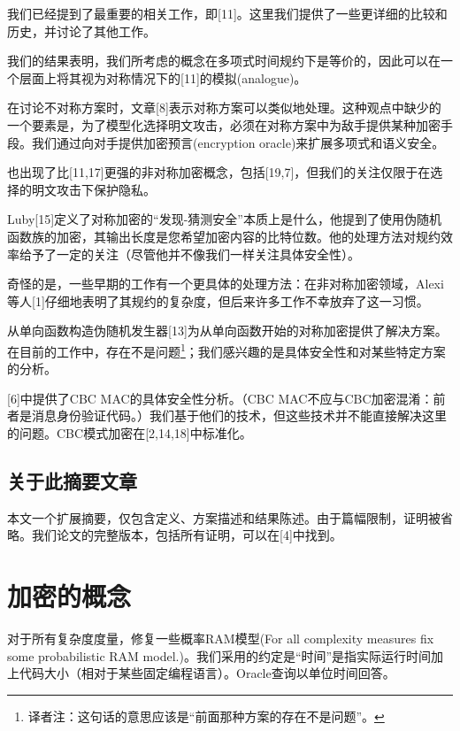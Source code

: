 \documentclass[]{article}
\begin{document}
我们已经提到了最重要的相关工作，即[11]。这里我们提供了一些更详细的比较和历史，并讨论了其他工作。\par

我们的结果表明，我们所考虑的概念在多项式时间规约下是等价的，因此可以在一个层面上将其视为对称情况下的[11]的模拟(analogue)。\par

在讨论不对称方案时，文章[8]表示对称方案可以类似地处理。这种观点中缺少的一个要素是，为了模型化选择明文攻击，必须在对称方案中为敌手提供某种加密手段。我们通过向对手提供加密预言(encryption oracle)来扩展多项式和语义安全。\par

也出现了比[11,17]更强的非对称加密概念，包括[19,7]，但我们的关注仅限于在选择的明文攻击下保护隐私。\par

Luby[15]定义了对称加密的“发现-猜测安全”本质上是什么，他提到了使用伪随机函数族的加密，其输出长度是您希望加密内容的比特位数。他的处理方法对规约效率给予了一定的关注（尽管他并不像我们一样关注具体安全性）。\par

奇怪的是，一些早期的工作有一个更具体的处理方法：在非对称加密领域，Alexi等人[1]仔细地表明了其规约的复杂度，但后来许多工作不幸放弃了这一习惯。\par

从单向函数构造伪随机发生器[13]为从单向函数开始的对称加密提供了解决方案。在目前的工作中，存在不是问题\footnote{译者注：这句话的意思应该是“前面那种方案的存在不是问题”。}；我们感兴趣的是具体安全性和对某些特定方案的分析。\par

[6]中提供了CBC MAC的具体安全性分析。（CBC MAC不应与CBC加密混淆：前者是消息身份验证代码。）我们基于他们的技术，但这些技术并不能直接解决这里的问题。CBC模式加密在[2,14,18]中标准化。

\subsection{关于此摘要文章}
本文一个扩展摘要，仅包含定义、方案描述和结果陈述。由于篇幅限制，证明被省略。我们论文的完整版本，包括所有证明，可以在[4]中找到。

\section{加密的概念}
对于所有复杂度度量，修复一些概率RAM模型(For all complexity measures fix some probabilistic RAM
model.)。我们采用的约定是“时间”是指实际运行时间加上代码大小（相对于某些固定编程语言）。Oracle查询以单位时间回答。\par
\end{document}
